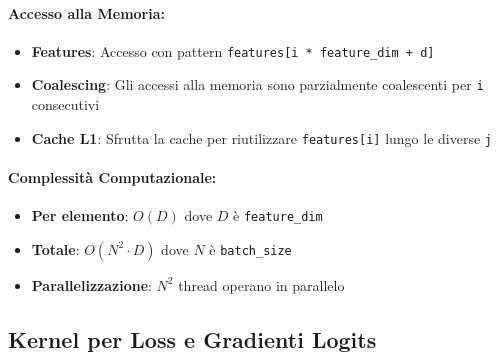 \documentclass[a4paper,11pt]{article}
\begin{document}
\paragraph{Accesso alla Memoria:}
\begin{itemize}
    \item \textbf{Features}: Accesso con pattern \texttt{features[i * feature\_dim + d]}
    \item \textbf{Coalescing}: Gli accessi alla memoria sono parzialmente coalescenti per \texttt{i} consecutivi
    \item \textbf{Cache L1}: Sfrutta la cache per riutilizzare \texttt{features[i]} lungo le diverse \texttt{j}
\end{itemize}

\paragraph{Complessità Computazionale:}
\begin{itemize}
    \item \textbf{Per elemento}: $O(D)$ dove $D$ è \texttt{feature\_dim}
    \item \textbf{Totale}: $O(N^2 \cdot D)$ dove $N$ è \texttt{batch\_size}
    \item \textbf{Parallelizzazione}: $N^2$ thread operano in parallelo
\end{itemize}

\subsection{Kernel per Loss e Gradienti Logits}
\end{document}
